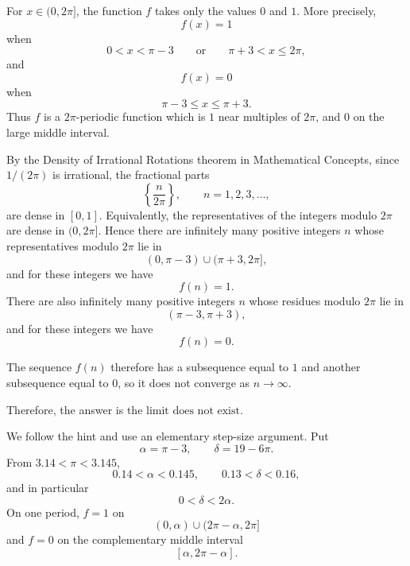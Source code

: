     \begin{solutions}
        \begin{solution}
            For $x\in(0,2\pi]$, the function $f$ takes only the values $0$ and $1$. More precisely,
            \[
                f(x)=1
            \]
            when
            \[
                0<x<\pi-3
                \qquad\text{or}\qquad
                \pi+3<x\leq 2\pi,
            \]
            and
            \[
                f(x)=0
            \]
            when
            \[
                \pi-3\leq x\leq \pi+3.
            \]
            Thus $f$ is a $2\pi$-periodic function which is $1$ near multiples of $2\pi$, and
            $0$ on the large middle interval.

            By the Density of Irrational Rotations theorem in Mathematical Concepts, since
            $1/(2\pi)$ is irrational, the fractional parts
            \[
                \left\{\frac{n}{2\pi}\right\},
                \qquad n=1,2,3,\dots,
            \]
            are dense in $[0,1]$. Equivalently, the representatives of the integers
            modulo $2\pi$ are dense in $(0,2\pi]$. Hence there are infinitely many
            positive integers $n$ whose representatives modulo $2\pi$ lie in
            \[
                (0,\pi-3)\cup(\pi+3,2\pi],
            \]
            and for these integers we have
            \[
                f(n)=1.
            \]
            There are also infinitely many positive integers $n$ whose residues modulo $2\pi$ lie in
            \[
                (\pi-3,\pi+3),
            \]
            and for these integers we have
            \[
                f(n)=0.
            \]

            The sequence $f(n)$ therefore has a subsequence equal to $1$ and another
            subsequence equal to $0$, so it does not converge as $n\to\infty$.

            Therefore, the answer is $\boxed{\text{the limit does not exist}}$.
        \end{solution}

        \begin{solution}
            We follow the hint and use an elementary step-size argument. Put
            \[
                \alpha=\pi-3,
                \qquad
                \delta=19-6\pi.
            \]
            From $3.14<\pi<3.145$,
            \[
                0.14<\alpha<0.145,
                \qquad
                0.13<\delta<0.16,
            \]
            and in particular
            \[
                0<\delta<2\alpha.
            \]
            On one period, $f=1$ on
            \[
                (0,\alpha)\cup(2\pi-\alpha,2\pi]
            \]
            and $f=0$ on the complementary middle interval
            \[
                [\alpha,2\pi-\alpha].
            \]


\end{solution}
\end{solutions}
